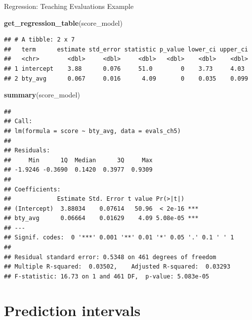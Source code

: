 \documentclass[
  ignorenonframetext,
]{beamer}
\newenvironment{Shaded}{\begin{snugshade}}{\end{snugshade}}
\newcommand{\FunctionTok}[1]{\textcolor[rgb]{0.13,0.29,0.53}{\textbf{#1}}}
\newcommand{\NormalTok}[1]{#1}
\begin{document}
\begin{frame}[fragile]{Regression: Teaching Evaluations Example}
\protect\hypertarget{regression-teaching-evaluations-example-13}{}
\tiny

\begin{Shaded}
\begin{Highlighting}[]
\FunctionTok{get\_regression\_table}\NormalTok{(score\_model)}
\end{Highlighting}
\end{Shaded}

\begin{verbatim}
## # A tibble: 2 x 7
##   term      estimate std_error statistic p_value lower_ci upper_ci
##   <chr>        <dbl>     <dbl>     <dbl>   <dbl>    <dbl>    <dbl>
## 1 intercept    3.88      0.076     51.0        0    3.73     4.03 
## 2 bty_avg      0.067     0.016      4.09       0    0.035    0.099
\end{verbatim}

\begin{Shaded}
\begin{Highlighting}[]
\FunctionTok{summary}\NormalTok{(score\_model)}
\end{Highlighting}
\end{Shaded}

\begin{verbatim}
## 
## Call:
## lm(formula = score ~ bty_avg, data = evals_ch5)
## 
## Residuals:
##     Min      1Q  Median      3Q     Max 
## -1.9246 -0.3690  0.1420  0.3977  0.9309 
## 
## Coefficients:
##             Estimate Std. Error t value Pr(>|t|)    
## (Intercept)  3.88034    0.07614   50.96  < 2e-16 ***
## bty_avg      0.06664    0.01629    4.09 5.08e-05 ***
## ---
## Signif. codes:  0 '***' 0.001 '**' 0.01 '*' 0.05 '.' 0.1 ' ' 1
## 
## Residual standard error: 0.5348 on 461 degrees of freedom
## Multiple R-squared:  0.03502,    Adjusted R-squared:  0.03293 
## F-statistic: 16.73 on 1 and 461 DF,  p-value: 5.083e-05
\end{verbatim}

\normalsize
\end{frame}

\hypertarget{prediction-intervals}{%
\section{Prediction intervals}\label{prediction-intervals}}
\end{document}
